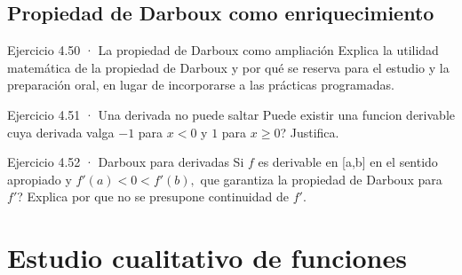 \documentclass[10pt,a4paper,oneside,openany]{book}
\begin{document}
\section{Propiedad de Darboux como enriquecimiento}
\begin{PSevenExerciseFixed}{Ejercicio 4.50 · La propiedad de Darboux como ampliación}
Explica la utilidad matemática de la propiedad de Darboux y por qué se reserva para el estudio y la preparación oral, en lugar de incorporarse a las prácticas programadas.
\end{PSevenExerciseFixed}
\begin{PSevenExerciseFixed}{Ejercicio 4.51 · Una derivada no puede saltar}
Puede existir una funcion derivable cuya derivada valga \(-1\) para \(x<0\) y \(1\) para \(x\ge 0\)? Justifica.
\end{PSevenExerciseFixed}
\begin{PSevenExerciseFixed}{Ejercicio 4.52 · Darboux para derivadas}
Si \(f\) es derivable en [a,b] en el sentido apropiado y \(f'(a)<0<f'(b),\) que garantiza la propiedad de Darboux para \(f'\)? Explica por que no se presupone continuidad de \(f'\).
\end{PSevenExerciseFixed}
\chapter{Estudio cualitativo de funciones}
\end{document}
